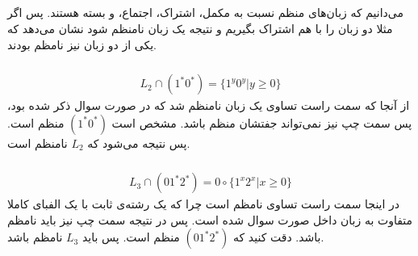 \subsection{}
می‌دانیم که زبان‌های منظم نسبت به مکمل، اشتراک، اجتماع،
 و 
بسته هستند. پس اگر مثلا دو زبان را با هم اشتراک بگیریم و نتیجه یک زبان نامنظم شود نشان می‌دهد که
یکی از دو زبان نیز نامظم بودند.
\subsubsection{}
\begin{gather*}
    L_2 \cap (1^* 0^*) = \{1^y 0^y | y \ge 0\}
\end{gather*}
از آنجا که سمت راست تساوی یک زبان نامنظم شد که در صورت سوال ذکر شده بود، پس سمت چپ نیز نمی‌تواند جفتشان
منظم باشد. مشخص است
$(1^* 0^*)$
منظم است. پس نتیجه می‌شود که
$L_2$
نامنظم است.
\subsubsection{}
\begin{gather*}
    L_3 \cap (0 1^* 2^*) = 0 \circ \{1^x 2^x | x \ge 0\}
\end{gather*}
در اینجا سمت راست تساوی نامظم است چرا که یک رشته‌ی ثابت با یک الفبای کاملا متفاوت به زبان داخل صورت سوال
شده است. پس در نتیجه سمت چپ نیز باید نامظم باشد. دقت کنید که 
$(0 1^* 2^*)$
منظم است. پس باید
$L_3$
نامظم باشد.